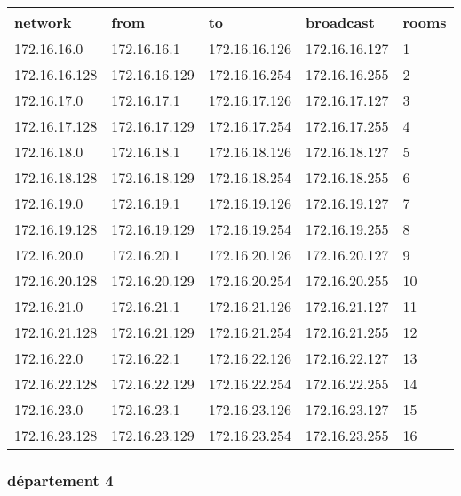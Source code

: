 \documentclass[11pt]{article}
\begin{document}
\begin{center}
\begin{tabular}{|l|l|l|l|l|}
\hline
network & from & to & broadcast & rooms \\
\hline
172.16.16.0 & 172.16.16.1 & 172.16.16.126 & 172.16.16.127 & 1 \\
\hline
172.16.16.128 & 172.16.16.129 & 172.16.16.254 & 172.16.16.255 & 2 \\
\hline
172.16.17.0 & 172.16.17.1 & 172.16.17.126 & 172.16.17.127 & 3 \\
\hline
172.16.17.128 & 172.16.17.129 & 172.16.17.254 & 172.16.17.255 & 4 \\
\hline
172.16.18.0 & 172.16.18.1 & 172.16.18.126 & 172.16.18.127 & 5 \\
\hline
172.16.18.128 & 172.16.18.129 & 172.16.18.254 & 172.16.18.255 & 6 \\
\hline
172.16.19.0 & 172.16.19.1 & 172.16.19.126 & 172.16.19.127 & 7 \\
\hline
172.16.19.128 & 172.16.19.129 & 172.16.19.254 & 172.16.19.255 & 8 \\
\hline
172.16.20.0 & 172.16.20.1 & 172.16.20.126 & 172.16.20.127 & 9 \\
\hline
172.16.20.128 & 172.16.20.129 & 172.16.20.254 & 172.16.20.255 & 10 \\
\hline
172.16.21.0 & 172.16.21.1 & 172.16.21.126 & 172.16.21.127 & 11 \\
\hline
172.16.21.128 & 172.16.21.129 & 172.16.21.254 & 172.16.21.255 & 12 \\
\hline
172.16.22.0 & 172.16.22.1 & 172.16.22.126 & 172.16.22.127 & 13 \\
\hline
172.16.22.128 & 172.16.22.129 & 172.16.22.254 & 172.16.22.255 & 14 \\
\hline
172.16.23.0 & 172.16.23.1 & 172.16.23.126 & 172.16.23.127 & 15 \\
\hline
172.16.23.128 & 172.16.23.129 & 172.16.23.254 & 172.16.23.255 & 16 \\
\hline
\end{tabular}
\end{center}

\subsubsection{département 4}
\label{sec:orgheadline8}
\end{document}
